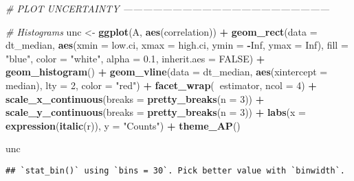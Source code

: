 \documentclass[11pt,]{article}
\newenvironment{Shaded}{\begin{snugshade}}{\end{snugshade}}
\newcommand{\CommentTok}[1]{\textcolor[rgb]{0.56,0.35,0.01}{\textit{#1}}}
\newcommand{\DataTypeTok}[1]{\textcolor[rgb]{0.13,0.29,0.53}{#1}}
\newcommand{\DecValTok}[1]{\textcolor[rgb]{0.00,0.00,0.81}{#1}}
\newcommand{\FloatTok}[1]{\textcolor[rgb]{0.00,0.00,0.81}{#1}}
\newcommand{\KeywordTok}[1]{\textcolor[rgb]{0.13,0.29,0.53}{\textbf{#1}}}
\newcommand{\NormalTok}[1]{#1}
\newcommand{\OperatorTok}[1]{\textcolor[rgb]{0.81,0.36,0.00}{\textbf{#1}}}
\newcommand{\OtherTok}[1]{\textcolor[rgb]{0.56,0.35,0.01}{#1}}
\newcommand{\StringTok}[1]{\textcolor[rgb]{0.31,0.60,0.02}{#1}}
\begin{document}
\begin{Shaded}
\begin{Highlighting}[]
\CommentTok{# PLOT UNCERTAINTY ---------------------------------------------------------------}

\CommentTok{# Histograms}
\NormalTok{unc <-}\StringTok{ }\KeywordTok{ggplot}\NormalTok{(A, }\KeywordTok{aes}\NormalTok{(correlation)) }\OperatorTok{+}
\StringTok{  }\KeywordTok{geom_rect}\NormalTok{(}\DataTypeTok{data =}\NormalTok{ dt_median,}
            \KeywordTok{aes}\NormalTok{(}\DataTypeTok{xmin =}\NormalTok{ low.ci,}
                \DataTypeTok{xmax =}\NormalTok{ high.ci,}
                \DataTypeTok{ymin =} \OperatorTok{-}\OtherTok{Inf}\NormalTok{,}
                \DataTypeTok{ymax =} \OtherTok{Inf}\NormalTok{),}
            \DataTypeTok{fill =} \StringTok{"blue"}\NormalTok{,}
            \DataTypeTok{color =} \StringTok{"white"}\NormalTok{,}
            \DataTypeTok{alpha =} \FloatTok{0.1}\NormalTok{,}
            \DataTypeTok{inherit.aes =} \OtherTok{FALSE}\NormalTok{) }\OperatorTok{+}
\StringTok{  }\KeywordTok{geom_histogram}\NormalTok{() }\OperatorTok{+}\StringTok{ }
\StringTok{  }\KeywordTok{geom_vline}\NormalTok{(}\DataTypeTok{data =}\NormalTok{ dt_median, }\KeywordTok{aes}\NormalTok{(}\DataTypeTok{xintercept =}\NormalTok{ median), }
             \DataTypeTok{lty =} \DecValTok{2}\NormalTok{, }
             \DataTypeTok{color =} \StringTok{"red"}\NormalTok{) }\OperatorTok{+}
\StringTok{  }\KeywordTok{facet_wrap}\NormalTok{(}\OperatorTok{~}\NormalTok{estimator, }
             \DataTypeTok{ncol =} \DecValTok{4}\NormalTok{) }\OperatorTok{+}
\StringTok{  }\KeywordTok{scale_x_continuous}\NormalTok{(}\DataTypeTok{breaks =} \KeywordTok{pretty_breaks}\NormalTok{(}\DataTypeTok{n =} \DecValTok{3}\NormalTok{)) }\OperatorTok{+}
\StringTok{  }\KeywordTok{scale_y_continuous}\NormalTok{(}\DataTypeTok{breaks =} \KeywordTok{pretty_breaks}\NormalTok{(}\DataTypeTok{n =} \DecValTok{3}\NormalTok{)) }\OperatorTok{+}
\StringTok{  }\KeywordTok{labs}\NormalTok{(}\DataTypeTok{x =} \KeywordTok{expression}\NormalTok{(}\KeywordTok{italic}\NormalTok{(r)), }
       \DataTypeTok{y =} \StringTok{"Counts"}\NormalTok{) }\OperatorTok{+}\StringTok{ }
\StringTok{  }\KeywordTok{theme_AP}\NormalTok{() }

\NormalTok{unc}
\end{Highlighting}
\end{Shaded}

\begin{verbatim}
## `stat_bin()` using `bins = 30`. Pick better value with `binwidth`.
\end{verbatim}
\end{document}
